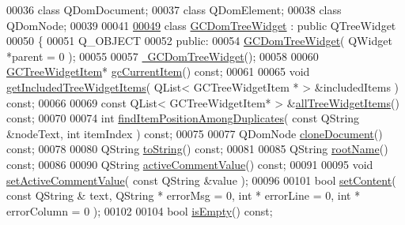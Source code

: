 \begin{DoxyCode}
00036 \textcolor{keyword}{class }QDomDocument;
00037 \textcolor{keyword}{class }QDomElement;
00038 \textcolor{keyword}{class }QDomNode;
00039 
00041 
\hypertarget{gcdomtreewidget_8h_source_l00049}{}\hyperlink{class_g_c_dom_tree_widget}{00049} \textcolor{keyword}{class }\hyperlink{class_g_c_dom_tree_widget}{GCDomTreeWidget} : \textcolor{keyword}{public} QTreeWidget
00050 \{
00051   Q\_OBJECT
00052 \textcolor{keyword}{public}:
00054   \hyperlink{class_g_c_dom_tree_widget_a915a336d44b042d8a134abef8805bed4}{GCDomTreeWidget}( QWidget *parent = 0 );
00055 
00057   \hyperlink{class_g_c_dom_tree_widget_aca9ba75d3798606da3f4e86c2a4b7113}{~GCDomTreeWidget}();
00058 
00060   \hyperlink{class_g_c_tree_widget_item}{GCTreeWidgetItem}* \hyperlink{class_g_c_dom_tree_widget_a70d6a155777d375f3923c2d66e702d15}{gcCurrentItem}() \textcolor{keyword}{const};
00061 
00065   \textcolor{keywordtype}{void} \hyperlink{class_g_c_dom_tree_widget_ad26a2880721b62182091ead365799d57}{getIncludedTreeWidgetItems}( QList< GCTreeWidgetItem * > &includedItems )
       \textcolor{keyword}{const};
00066 
00069   \textcolor{keyword}{const} QList< GCTreeWidgetItem* > &\hyperlink{class_g_c_dom_tree_widget_a913ceee0af8eefd3ec41115b64008b55}{allTreeWidgetItems}() \textcolor{keyword}{const};
00070 
00074   \textcolor{keywordtype}{int} \hyperlink{class_g_c_dom_tree_widget_a6da326993346229db9ba34fc13d7265e}{findItemPositionAmongDuplicates}( \textcolor{keyword}{const} QString &nodeText, \textcolor{keywordtype}{int} itemIndex )
       \textcolor{keyword}{const};
00075 
00077   QDomNode \hyperlink{class_g_c_dom_tree_widget_a25d3fcc908e06b83eba4f7d1c0e0df89}{cloneDocument}() \textcolor{keyword}{const};
00078 
00080   QString \hyperlink{class_g_c_dom_tree_widget_a6cd086334f363b2d0038c815e54c2b69}{toString}() \textcolor{keyword}{const};
00081 
00085   QString \hyperlink{class_g_c_dom_tree_widget_af70ce22ef830a0a546262ff8566cd731}{rootName}() \textcolor{keyword}{const};
00086 
00090   QString \hyperlink{class_g_c_dom_tree_widget_aa633c35eca5e015becede2518e031042}{activeCommentValue}() \textcolor{keyword}{const};
00091 
00095   \textcolor{keywordtype}{void} \hyperlink{class_g_c_dom_tree_widget_a29bd5591054036ef5d6073a606716df3}{setActiveCommentValue}( \textcolor{keyword}{const} QString &value );
00096 
00101   \textcolor{keywordtype}{bool} \hyperlink{class_g_c_dom_tree_widget_a7bcd409950b7e72202426ac0c42c9476}{setContent}( \textcolor{keyword}{const} QString & text, QString * errorMsg = 0, \textcolor{keywordtype}{int} * 
      errorLine = 0, \textcolor{keywordtype}{int} * errorColumn = 0 );
00102 
00104   \textcolor{keywordtype}{bool} \hyperlink{class_g_c_dom_tree_widget_a98fe9b2e23ec44757fc4bcc6be7270c0}{isEmpty}() \textcolor{keyword}{const};

\end{DoxyCode}
